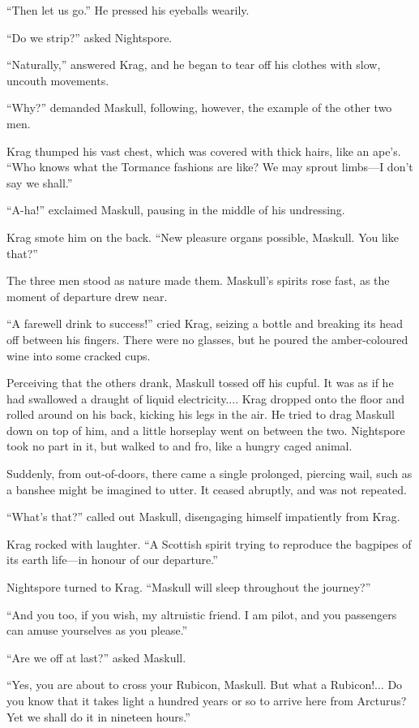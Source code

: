 ``Then let us go.'' He pressed his eyeballs wearily.

``Do we strip?'' asked Nightspore.

``Naturally,'' answered Krag, and he began to tear off his clothes with slow, uncouth movements.

``Why?'' demanded Maskull, following, however, the example of the other two men.

Krag thumped his vast chest, which was covered with thick hairs, like an ape's. ``Who knows what the Tormance fashions are like? We may sprout limbs—I don't say we shall.''

``A-ha!'' exclaimed Maskull, pausing in the middle of his undressing.

Krag smote him on the back. ``New pleasure organs possible, Maskull. You like that?''

The three men stood as nature made them. Maskull's spirits rose fast, as the moment of departure drew near.

``A farewell drink to success!'' cried Krag, seizing a bottle and breaking its head off between his fingers. There were no glasses, but he poured the amber-coloured wine into some cracked cups.

Perceiving that the others drank, Maskull tossed off his cupful. It was as if he had swallowed a draught of liquid electricity.... Krag dropped onto the floor and rolled around on his back, kicking his legs in the air. He tried to drag Maskull down on top of him, and a little horseplay went on between the two. Nightspore took no part in it, but walked to and fro, like a hungry caged animal.

Suddenly, from out-of-doors, there came a single prolonged, piercing wail, such as a banshee might be imagined to utter. It ceased abruptly, and was not repeated.

``What's that?'' called out Maskull, disengaging himself impatiently from Krag.

Krag rocked with laughter. ``A Scottish spirit trying to reproduce the bagpipes of its earth life—in honour of our departure.''

Nightspore turned to Krag. ``Maskull will sleep throughout the journey?''

``And you too, if you wish, my altruistic friend. I am pilot, and you passengers can amuse yourselves as you please.''

``Are we off at last?'' asked Maskull.

``Yes, you are about to cross your Rubicon, Maskull. But what a Rubicon!... Do you know that it takes light a hundred years or so to arrive here from Arcturus? Yet we shall do it in nineteen hours.''

